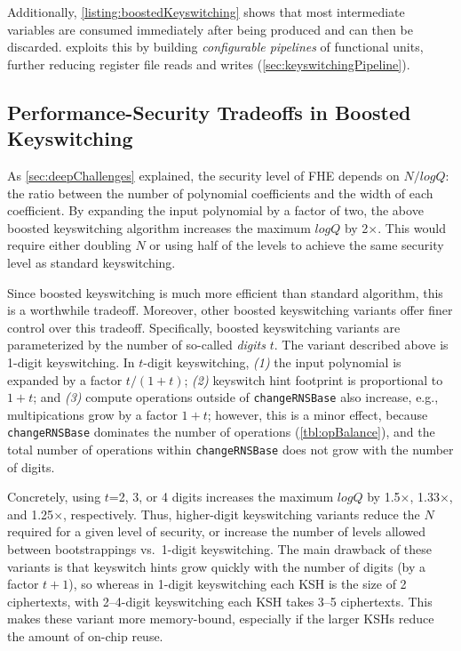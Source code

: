 Additionally, \autoref{listing:boostedKeyswitching} shows that most intermediate
variables are consumed immediately after being produced and can then be discarded.
\name exploits this by building \emph{configurable pipelines} of functional units,
further reducing register file reads and writes (\autoref{sec:keyswitchingPipeline}).

\subsection{Performance-Security Tradeoffs in Boosted Keyswitching}
\label{sec:boostedSecurity}

As \autoref{sec:deepChallenges} explained,
the security level of FHE depends on $N/logQ$:
the ratio between the number of polynomial coefficients and the width of each coefficient.
By expanding the input polynomial by a factor of two, the above boosted keyswitching algorithm increases the maximum $logQ$ by 2$\times$.
This would require either doubling $N$ or using half of the levels to achieve the same security level as standard keyswitching.

Since boosted keyswitching is much more efficient than standard algorithm, this is a worthwhile tradeoff.
Moreover, other boosted keyswitching variants offer finer control over this tradeoff.
Specifically, boosted keyswitching variants are parameterized by the number of so-called \emph{digits} $t$.
The variant described above is 1-digit keyswitching.
In $t$-digit keyswitching,
\emph{(1)} the input polynomial is expanded by a factor $t/(1+t)$;
\emph{(2)} keyswitch hint footprint is proportional to $1+t$; and
\emph{(3)} compute operations outside of \texttt{changeRNSBase} also increase, e.g., multipications grow by a factor $1+t$;
however, this is a minor effect, because \texttt{changeRNSBase} dominates the number of operations (\autoref{tbl:opBalance}),
and the total number of operations within \texttt{changeRNSBase} does not grow with the number of digits.

Concretely, using $t$=2, 3, or 4 digits increases the maximum $logQ$ by 1.5$\times$, 1.33$\times$, and 1.25$\times$, respectively.
Thus, higher-digit keyswitching variants reduce the $N$ required for a given level of security,
or increase the number of levels allowed between bootstrappings vs.\ 1-digit keyswitching.
The main drawback of these variants is that keyswitch hints grow quickly with the number of digits (by a factor $t+1$),
so whereas in 1-digit keyswitching each KSH is the size of 2 ciphertexts, with 2--4-digit keyswitching
each KSH takes 3--5 ciphertexts.
This makes these variant more memory-bound,
especially if the larger KSHs reduce the amount of on-chip reuse.

